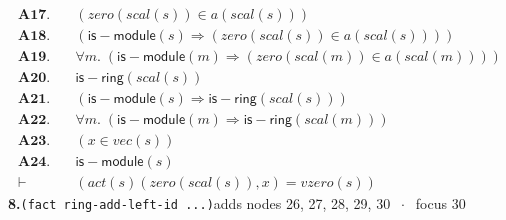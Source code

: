 \documentclass[11pt]{article}
\begin{document}
\begin{align*}
  \mathbf{A17.}\quad & (\mathit{zero}(\mathit{scal}(s)) \in a(\mathit{scal}(s))) \\
  \mathbf{A18.}\quad & (\mathsf{is{-}module}(s) \Rightarrow (\mathit{zero}(\mathit{scal}(s)) \in a(\mathit{scal}(s)))) \\
  \mathbf{A19.}\quad & \forall m.\; (\mathsf{is{-}module}(m) \Rightarrow (\mathit{zero}(\mathit{scal}(m)) \in a(\mathit{scal}(m)))) \\
  \mathbf{A20.}\quad & \mathsf{is{-}ring}(\mathit{scal}(s)) \\
  \mathbf{A21.}\quad & (\mathsf{is{-}module}(s) \Rightarrow \mathsf{is{-}ring}(\mathit{scal}(s))) \\
  \mathbf{A22.}\quad & \forall m.\; (\mathsf{is{-}module}(m) \Rightarrow \mathsf{is{-}ring}(\mathit{scal}(m))) \\
  \mathbf{A23.}\quad & (x \in \mathit{vec}(s)) \\
  \mathbf{A24.}\quad & \mathsf{is{-}module}(s) \\
  \vdash\quad & (\mathit{act}(s)(\mathit{zero}(\mathit{scal}(s)), x) = \mathit{vzero}(s))
\end{align*}
\medskip\noindent\textbf{8.}\quad \texttt{(fact ring-add-left-id ...)}\hfill{\small adds nodes 26, 27, 28, 29, 30 $\;\cdot\;$ focus 30}\\[2pt]
\end{document}
